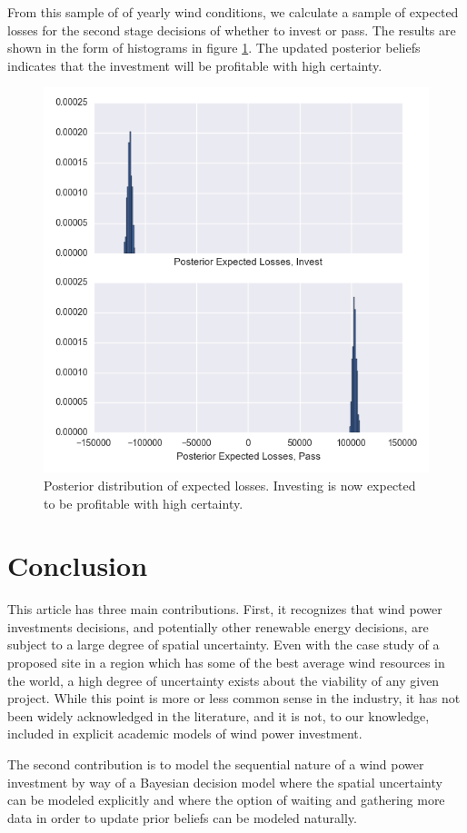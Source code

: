 \documentclass[11pt]{article}
\begin{document}
From this sample of of yearly wind conditions, we calculate a sample of expected losses for the second stage decisions of whether to invest or pass. The results are shown in the form of histograms in figure \ref{post_losses}. The updated posterior beliefs indicates that the investment will be profitable with high certainty. 

\begin{figure}
	\centering
	\includegraphics[width=.8\textwidth]{figures/post_losses.png}
	\caption{Posterior distribution of expected losses. Investing is now expected to be profitable with high certainty.}
	\label{post_losses}
\end{figure}


\section{Conclusion}
This article has three main contributions. First, it recognizes that wind power investments decisions, and potentially other renewable energy decisions, are subject to a large degree of spatial uncertainty. Even with the case study of a proposed site in a region which has some of the best average wind resources in the world, a high degree of uncertainty exists about the viability of any given project. While this point is more or less common sense in the industry, it has not been widely acknowledged in the literature, and it is not, to our knowledge, included in explicit academic models of wind power investment. 

The second contribution is to model the sequential nature of a wind power investment by way of a Bayesian decision model where the spatial uncertainty can be modeled explicitly and where the option of waiting and gathering more data in order to update prior beliefs can be modeled naturally. 
\end{document}
